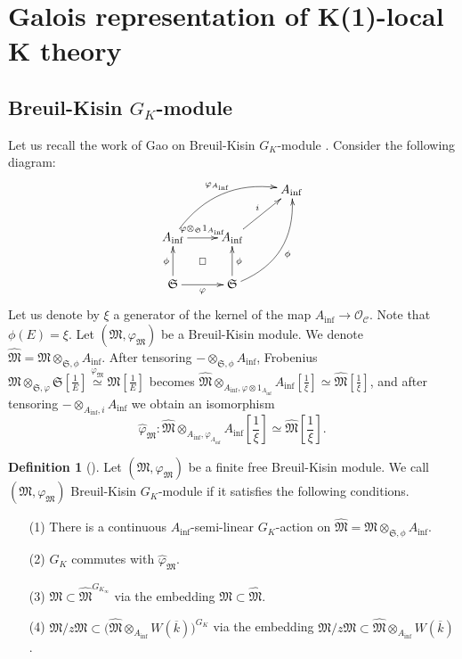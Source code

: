 \documentclass[11pt]{amsart}
\newcommand{\sO}{\mathcal{O}}
\newcommand{\fM}{\mathfrak{M}}
\newcommand{\ol}{\overline}
\newcommand{\Ainf}{A_{\operatorname{inf}}}
\newcommand{\Cu}{\mathcal{C}}
\newcommand{\mS}{\mathfrak{S}}
\theoremstyle{definition}
\newtheorem{defn}[lemma]{Definition}
\theoremstyle{remark}
\numberwithin{equation}{section}
\begin{document}
\section{Galois representation of K(1)-local K theory}

\subsection{Breuil-Kisin $G_K$-module} Let us recall the work of Gao on Breuil-Kisin $G_K$-module \cite{Gao}. Consider the following diagram: 
\[
\xymatrix{
&& \Ainf \\
\Ainf \ar@/^18pt/[rru]^{\varphi_{\Ainf}} \ar@{}[rd]|{\square} \ar[r]^{\varphi\otimes_{\mS} 1_{\Ainf}} & \Ainf \ar[ru]^{i}& \\
  \mS \ar[u]^{\phi} \ar[r]_{\varphi} & \mS \ar[u]_{\phi}\ar@/_18pt/[ruu]_{\phi}&
}
\]
Let us denote by $\xi$ a generator of the kernel of the map $\Ainf \to \sO_\Cu$. Note that $\phi(E)=\xi$. Let $(\fM,\varphi_\fM)$ be a Breuil-Kisin module. We denote $\widehat{\fM}=\fM\otimes_{\mS,\phi}\Ainf$. After tensoring $-\otimes_{\mS,\phi} \Ainf$, Frobenius $\fM\otimes_{\mS,\varphi}\mS[\frac{1}{E}]\overset{\varphi_{\fM}}{\simeq}\fM[\frac{1}{E}]$ becomes $\widehat{\fM}\otimes_{\Ainf,\varphi\otimes 1_{\Ainf}} \Ainf[\frac{1}{\xi}] \simeq \widehat{\fM}[\frac{1}{\xi}]$, and after tensoring $-\otimes_{\Ainf,i}\Ainf$ we obtain an isomorphism
\begin{equation}\label{power}
\widehat{\varphi}_{\fM}:\widehat{\fM}\otimes_{\Ainf,\varphi_{\Ainf}} \Ainf[\frac{1}{\xi}] \simeq \widehat{\fM}[\frac{1}{\xi}].
\end{equation}

\begin{defn}[{\cite[Defn 7.1.1]{Gao}}]
Let $(\fM,\varphi_\fM)$ be a finite free Breuil-Kisin module. We call $(\fM,\varphi_\fM)$ Breuil-Kisin $G_K$-module if it satisfies the following conditions.
\begin{itemize}
  \item[(1)] There is a continuous $\Ainf$-semi-linear $G_K$-action on $\widehat{\fM}=\fM\otimes_{\mS,\phi}\Ainf$.
  \item[(2)] $G_K$ commutes with $\widehat{\varphi}_\fM$.
  \item[(3)] $\fM \subset \widehat{\fM}^{G_{K_\infty}}$ via the embedding $\fM \subset \widehat{\fM}$.
  \item[(4)] $\fM/z\fM\subset \bigl(\widehat{\fM}\otimes_{\Ainf}W(\ol{k})\bigr)^{G_K}$ via the embedding $\fM/z\fM\subset \widehat{\fM}\otimes_{\Ainf}W(\ol{k})$.
\end{itemize}
\end{defn}
\end{document}
